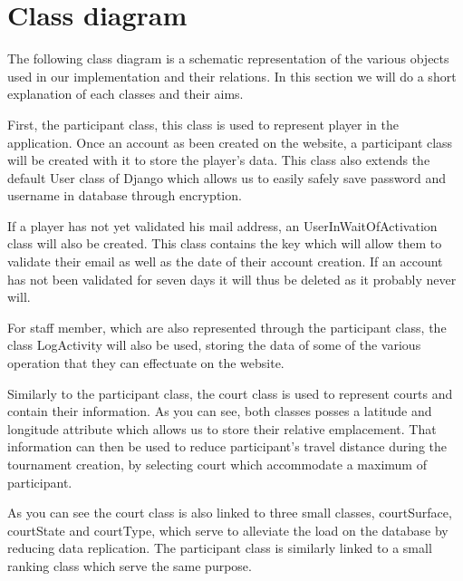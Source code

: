 \section{Class diagram}


The following class diagram is a schematic representation of the various
objects used in our implementation and their relations. In this section we will
do a short explanation of each classes and their aims.\newline

First, the participant class, this class is used to represent player in the
application. Once an account as been created on the website, a participant
class will be created with it to store the player's data. This class also
extends the default User class of Django which allows us to easily safely save
password and username in database through encryption.\newline

If a player has not yet validated his mail address, an UserInWaitOfActivation
class will also be created. This class contains the key which will allow them
to validate their email as well as the date of their account creation. If an
account has not been validated for seven days it will thus be deleted as it
probably never will.\newline

For staff member, which are also represented through the participant class, the
class LogActivity will also be used, storing the data of some of the various
operation that they can effectuate on the website. \newline

Similarly to the participant class, the court class is used to represent courts
and contain their information. As you can see, both classes posses a latitude
and longitude attribute which allows us to store their relative emplacement.
That information can then be used to reduce participant's travel distance
during the tournament creation, by selecting court which accommodate a maximum
of participant. \newline

As you can see the court class is also linked to three small classes,
courtSurface, courtState and courtType, which serve to alleviate the load on
the database by reducing data replication. The participant class is similarly
linked to a small ranking class which serve the same purpose. \newline

